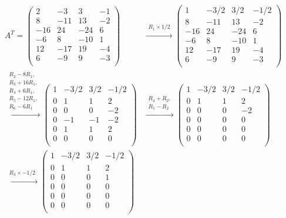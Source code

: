 \documentclass[12pt]{article}
\begin{document}
\begin{align*}
A^T
=
\left( \begin{array}{cccc}
2 & -3 & 3 & -1\\ 
8 & -11 & 13 & -2\\
-16 & 24 & -24 & 6\\ 
-6 & 8 & -10 & 1\\ 
12 & -17 & 19 & -4\\ 
6 & -9 & 9 & -3\\ 
\end{array} \right)
&\xrightarrow{\substack{R_1 \times 1/2}} 
\left( \begin{array}{cccc}
1 & -3/2 & 3/2 & -1/2\\ 
8 & -11 & 13 & -2\\
-16 & 24 & -24 & 6\\ 
-6 & 8 & -10 & 1\\ 
12 & -17 & 19 & -4\\ 
6 & -9 & 9 & -3\\ 
\end{array} \right)\\
\xrightarrow{\substack{R_2 - 8R_1,\\R_3 + 16R_1,\\R_4 + 6R_1,\\R_5 - 12R_1,\\R_6 - 6R_1}} 
\left( \begin{array}{cccc}
1 & -3/2 & 3/2 & -1/2\\ 
0 & 1 & 1 & 2\\
0 & 0 & 0 & -2\\ 
0 & -1 & -1 & -2\\ 
0 & 1 & 1 & 2\\ 
0 & 0 & 0 & 0 \\
\end{array} \right)
&\xrightarrow{\substack{R_4 + R_2,\\R_5 - R_2}} 
\left( \begin{array}{cccc}
1 & -3/2 & 3/2 & -1/2\\ 
0 & 1 & 1 & 2\\
0 & 0 & 0 & -2\\ 
0 & 0 & 0 & 0\\ 
0 & 0 & 0 & 0\\ 
0 & 0 & 0 & 0 \\
\end{array} \right)\\
\xrightarrow{\substack{R_3 \times -1/2}} 
\left( \begin{array}{cccc}
1 & -3/2 & 3/2 & -1/2\\ 
0 & 1 & 1 & 2\\
0 & 0 & 0 & 1\\ 
0 & 0 & 0 & 0\\ 
0 & 0 & 0 & 0\\ 
0 & 0 & 0 & 0 \\
\end{array} \right)
\end{align*}
\filbreak
\end{document}

